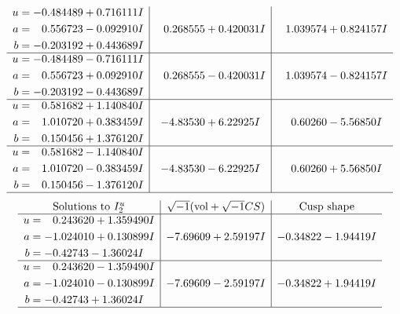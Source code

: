 \documentclass[1p]{elsarticle_modified}
\theoremstyle{definition}
\newcommand{\I}{\sqrt{-1}}
\begin{document}
$$\begin{array}{c|c|c}
\begin{aligned}
u &= -0.484489 + 0.716111 I \\
a &= \phantom{-}0.556723 - 0.092910 I \\
b &= -0.203192 + 0.443689 I\end{aligned}
 & \phantom{-}0.268555 + 0.420031 I & \phantom{-}1.039574 + 0.824157 I \\ \hline\begin{aligned}
u &= -0.484489 - 0.716111 I \\
a &= \phantom{-}0.556723 + 0.092910 I \\
b &= -0.203192 - 0.443689 I\end{aligned}
 & \phantom{-}0.268555 - 0.420031 I & \phantom{-}1.039574 - 0.824157 I \\ \hline\begin{aligned}
u &= \phantom{-}0.581682 + 1.140840 I \\
a &= \phantom{-}1.010720 + 0.383459 I \\
b &= \phantom{-}0.150456 + 1.376120 I\end{aligned}
 & -4.83530 + 6.22925 I & \phantom{-}0.60260 - 5.56850 I \\ \hline\begin{aligned}
u &= \phantom{-}0.581682 - 1.140840 I \\
a &= \phantom{-}1.010720 - 0.383459 I \\
b &= \phantom{-}0.150456 - 1.376120 I\end{aligned}
 & -4.83530 - 6.22925 I & \phantom{-}0.60260 + 5.56850 I\\
 \hline 
 \end{array}$$\newpage$$\begin{array}{c|c|c}  
\text{Solutions to }I^u_{2}& \I (\text{vol} + \sqrt{-1}CS) & \text{Cusp shape}\\
 \hline 
\begin{aligned}
u &= \phantom{-}0.243620 + 1.359490 I \\
a &= -1.024010 + 0.130899 I \\
b &= -0.42743 - 1.36024 I\end{aligned}
 & -7.69609 + 2.59197 I & -0.34822 - 1.94419 I \\ \hline\begin{aligned}
u &= \phantom{-}0.243620 - 1.359490 I \\
a &= -1.024010 - 0.130899 I \\
b &= -0.42743 + 1.36024 I\end{aligned}
 & -7.69609 - 2.59197 I & -0.34822 + 1.94419 I\\
 \hline 
 \end{array}$$\newpage\newpage\renewcommand{\arraystretch}{1}
\end{document}
